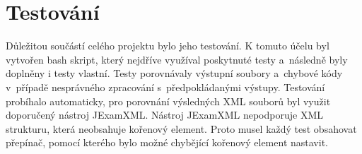 \documentclass[10pt,a4paper,final]{article}
\begin{document}
  \section{Testování} \label{testovanie}

Důležitou součástí celého projektu bylo jeho testování. K tomuto účelu byl vytvořen bash skript, který nejdříve využíval poskytnuté testy a~následně byly doplněny i testy vlastní. Testy porovnávaly výstupní soubory a~chybové kódy v~případě nesprávného zpracování s~předpokládanými výstupy. Testování probíhalo automaticky, pro porovnání výsledných XML souborů byl využit doporučený nástroj JExamXML. Nástroj JExamXML nepodporuje XML strukturu, která neobsahuje kořenový element. Proto musel každý test obsahovat přepínač, pomocí kterého bylo možné chybějící kořenový element nastavit. 
    
\end{document}
